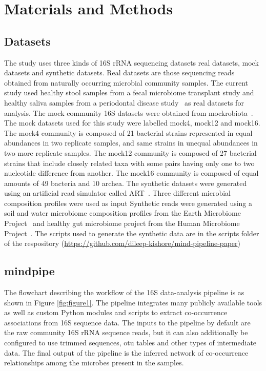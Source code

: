 
\section*{Materials and Methods}

  \subsection*{Datasets}

  \vspace{-5mm}
  The study uses three kinds of 16S rRNA sequencing datasets \- real datasets, mock datasets and synthetic datasets.
  Real datasets are those sequencing reads obtained from naturally occurring microbial community samples.
  The current study used healthy stool samples from a fecal microbiome transplant study \cite{Kang2017} and healthy saliva samples from a periodontal disease study~\cite{Chen2018} as real datasets for analysis.
  The mock community 16S datasets were obtained from mockrobiota~\cite{Bokulich2016}.
  The mock datasets used for this study were labelled mock4, mock12 and mock16.
  The mock4 community is composed of 21 bacterial strains represented in equal abundances in two replicate samples, and same strains in unequal abundances in two more replicate samples.
  The mock12 community is composed of 27 bacterial strains that include closely related taxa with some pairs having only one to two nucleotide difference from another.
  The mock16 community is composed of equal amounts of 49 bacteria and 10 archea.
  The synthetic datasets were generated using an artificial read simulator called ART~\cite{Huang2012}.
  Three different microbial composition profiles were used as input
  Synthetic reads were generated using a soil and water microbiome composition profiles from the Earth Microbiome Project~\cite{Thompson2017} and healthy gut microbiome project from the Human Microbiome Project~\cite{HumanMicrobiomeProjectConsortium2012}.
  The scripts used to generate the synthetic data are in the scripts folder of the respository (\href{https://github.com/dileep-kishore/mind-pipeline-paper}{https://github.com/dileep-kishore/mind-pipeline-paper})

  \subsection*{mindpipe}

  \vspace{-5mm}
  The flowchart describing the workflow of the 16S data-analysis pipeline is as shown in Figure \ref{fig:figure1}.
  The pipeline integrates many publicly available tools as well as custom Python modules and scripts to extract co-occurrence associations from 16S sequence data.
  The inputs to the pipeline by default are the raw community 16S rRNA sequence reads, but it can also additionally be configured to use trimmed sequences, \ac{otu} tables and other types of intermediate data.
  The final output of the pipeline is the inferred network of co-occurrence relationships among the microbes present in the samples.

